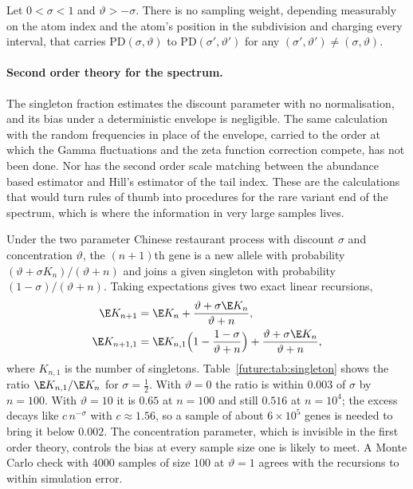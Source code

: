 \begin{conjecture}\label{future:conj:rigid}
Let $0<\sigma<1$ and $\vartheta>-\sigma$. There is no sampling weight, depending measurably on the
atom index and the atom's position in the subdivision and charging every interval, that carries $\mathrm{PD}(\sigma,\vartheta)$
to $\mathrm{PD}(\sigma',\vartheta')$ for any $(\sigma',\vartheta')\ne(\sigma,\vartheta)$.
\end{conjecture}

\paragraph{Second order theory for the spectrum.} The singleton
fraction estimates the discount parameter with no normalisation, and its bias under a
deterministic envelope is negligible. The same calculation with the random frequencies in place
of the envelope, carried to the order at which the Gamma fluctuations and the zeta function
correction compete, has not been done. Nor has the second order scale matching between the
abundance based estimator and Hill's estimator of the tail index. These are the calculations that
would turn rules of thumb into procedures for the rare variant end of the spectrum, which is where
the information in very large samples lives.

\begin{example}\label{future:ex:singleton}
Under the two parameter Chinese restaurant process with discount $\sigma$ and concentration
$\vartheta$, the $(n+1)$th gene is a new allele with probability $(\vartheta+\sigma K_n)/(\vartheta+n)$
and joins a given singleton with probability $(1-\sigma)/(\vartheta+n)$. Taking expectations gives
two exact linear recursions,
\begin{align*}
\E K_{n+1}&=\E K_n+\frac{\vartheta+\sigma\E K_n}{\vartheta+n},\\
\E K_{n+1,1}&=\E K_{n,1}\Bigl(1-\frac{1-\sigma}{\vartheta+n}\Bigr)+\frac{\vartheta+\sigma\E K_n}{\vartheta+n},
\end{align*}
where $K_{n,1}$ is the number of singletons. Table~\ref{future:tab:singleton} shows the ratio
$\E K_{n,1}/\E K_n$ for $\sigma=\tfrac12$. With $\vartheta=0$ the ratio is within $0.003$ of
$\sigma$ by $n=100$. With $\vartheta=10$ it is $0.65$ at $n=100$ and still $0.516$ at $n=10^4$;
the excess decays like $c\,n^{-\sigma}$ with $c\approx1.56$, so a sample of about $6\times10^5$ genes is
needed to bring it below $0.002$. The concentration parameter, which is invisible in the first
order theory, controls the bias at every sample size one is likely to meet. A Monte Carlo check
with $4000$ samples of size $100$ at $\vartheta=1$ agrees with the recursions to within
simulation error.
\end{example}

